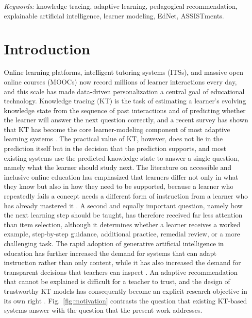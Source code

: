 \documentclass[11pt]{article}
\begin{document}
\noindent\textit{Keywords:} knowledge tracing, adaptive learning, pedagogical recommendation, explainable artificial intelligence, learner modeling, EdNet, ASSISTments.

\section{Introduction}

Online learning platforms, intelligent tutoring systems (ITSs), and massive open online courses (MOOCs) now record millions of learner interactions every day, and this scale has made data-driven personalization a central goal of educational technology. Knowledge tracing (KT) is the task of estimating a learner's evolving knowledge state from the sequence of past interactions and of predicting whether the learner will answer the next question correctly, and a recent survey has shown that KT has become the core learner-modeling component of most adaptive learning systems \cite{shen2024survey}. The practical value of KT, however, does not lie in the prediction itself but in the decision that the prediction supports, and most existing systems use the predicted knowledge state to answer a single question, namely what the learner should study next. The literature on accessible and inclusive online education has emphasized that learners differ not only in what they know but also in how they need to be supported, because a learner who repeatedly fails a concept needs a different form of instruction from a learner who has already mastered it \cite{lomellini2025accessible}. A second and equally important question, namely how the next learning step should be taught, has therefore received far less attention than item selection, although it determines whether a learner receives a worked example, step-by-step guidance, additional practice, remedial review, or a more challenging task. The rapid adoption of generative artificial intelligence in education has further increased the demand for systems that can adapt instruction rather than only content, while it has also increased the demand for transparent decisions that teachers can inspect \cite{denny2024computing}. An adaptive recommendation that cannot be explained is difficult for a teacher to trust, and the design of trustworthy KT models has consequently become an explicit research objective in its own right \cite{lu2024design}. Fig.~\ref{fig:motivation} contrasts the question that existing KT-based systems answer with the question that the present work addresses.
\end{document}
